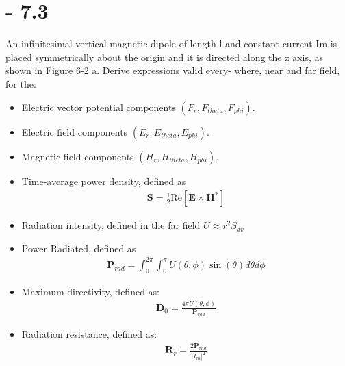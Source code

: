 \documentclass[12pt]{article}
\begin{document}
\section{- 7.3}
An infinitesimal vertical magnetic dipole of length l and constant current Im is placed symmetrically about the origin and it is directed along the z axis, as shown in Figure 6-2 a. Derive expressions valid every- where, near and far field, for the:
\begin{itemize}
\item Electric vector potential components $(F_r , F_{theta} , F_{phi} )$.
\item Electric field components $(E_r , E_{theta} , E_{phi} )$.
\item Magnetic field components $(H_r , H_{theta} , H_{phi} )$.
\item Time-average power density, defined as \\
  \begin{align*}
  \mathbf{S} = \frac{1}{2}\text{Re}{[\mathbf{E}\times\mathbf{H}^*]}
  \end{align*}
\item  Radiation intensity, defined in the far field $U \approx r^2S_{av}$
  \item Power Radiated, defined as \\
  \begin{align*}
  \mathbf{P}_{rad} = \int_0^{2\pi}\int_0^{\pi}U(\theta,\phi)\sin{(\theta)}d\theta d\phi
  \end{align*}
\item Maximum directivity, defined as:
  \begin{align*}
  \mathbf{D}_{0} = \frac{4\pi U(\theta,\phi)}{\mathbf{P}_{rad}}
  \end{align*}
\item Radiation resistance, defined as:
  \begin{align*}
  \mathbf{R}_{r} = \frac{2\mathbf{P}_{rad}}{|I_m|^2}
  \end{align*}
\end{itemize}
\end{document}
